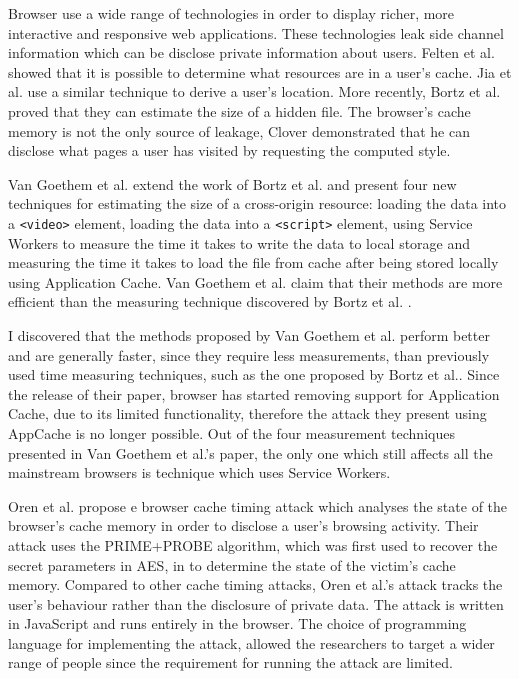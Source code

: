 \documentclass[10pt,a4paper,twoside]{book}
\begin{document}
Browser use a wide range of technologies in order to display richer, more interactive and responsive web applications. These technologies leak side channel information which can be disclose private information about users. Felten et al. \cite{felten2000timing} showed that it is possible to determine what resources are in a user's cache. Jia et al.\cite{jia2015know} use a similar technique to derive a user's location. More recently, Bortz et al.\cite{bortz2007exposing} proved that they can estimate the size of a hidden file. The browser's cache memory is not the only source of leakage, Clover\cite{cssvisited} demonstrated that he can disclose what pages a user has visited by requesting the computed style.

Van Goethem et al. \cite{van2015clock} extend the work of Bortz et al. \cite{bortz2007exposing} and present four new techniques for estimating the size of a cross-origin resource: loading the data into a \texttt{<video>} element, loading the data into a \texttt{<script>} element, using Service Workers to measure the time it takes to write the data to local storage and measuring the time it takes to load the file from cache after being stored locally using Application Cache. Van Goethem et al. \cite{van2015clock} claim that their methods are more efficient than the measuring technique discovered by Bortz et al. \cite{bortz2007exposing}. 

I discovered that the methods proposed by Van Goethem et al.\cite{van2015clock} perform better and are generally faster, since they require less measurements, than previously used time measuring techniques, such as the one proposed by Bortz et al.\cite{bortz2007exposing}. Since the release of their paper, browser has started removing support for Application Cache, due to its limited functionality, therefore the attack they present using AppCache is no longer possible. Out of the four measurement techniques presented in Van Goethem et al.'s \cite{van2015clock} paper, the only one which still affects all the mainstream browsers is technique which uses Service Workers. 

Oren et al.\cite{oren2015spy} propose e browser cache timing attack which analyses the state of the browser's cache memory in order to disclose a user's browsing activity. Their attack uses the PRIME+PROBE algorithm, which was first used to recover the secret parameters in AES\cite{pub2001197}, in to determine the state of the victim's cache memory. Compared to other cache timing attacks, Oren et al.'s \cite{oren2015spy} attack tracks the user's behaviour rather than the disclosure of private data. The attack is written in JavaScript and runs entirely in the browser. The choice of programming language for implementing the attack, allowed the researchers to target a wider range of people since the requirement for running the attack are limited. 
\end{document}
